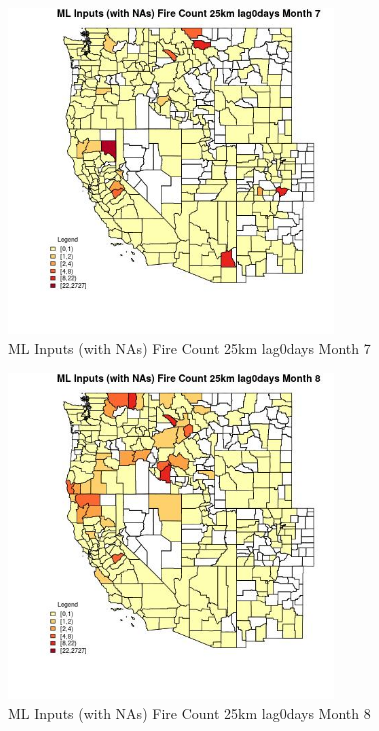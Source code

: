\begin{figure} 
\centering  
\includegraphics[width=0.77\textwidth]{Code_Outputs/Report_ML_input_PM25_Step4_part_f_de_duplicated_aves_prioritize_24hr_obswNAs_CountyFire_Count_25km_lag0daysmedianMonth7.jpg} 
\caption{\label{fig:Report_ML_input_PM25_Step4_part_f_de_duplicated_aves_prioritize_24hr_obswNAsCountyFire_Count_25km_lag0daysmedianMonth7}ML Inputs (with NAs) Fire Count 25km lag0days Month 7} 
\end{figure} 
 

\begin{figure} 
\centering  
\includegraphics[width=0.77\textwidth]{Code_Outputs/Report_ML_input_PM25_Step4_part_f_de_duplicated_aves_prioritize_24hr_obswNAs_CountyFire_Count_25km_lag0daysmedianMonth8.jpg} 
\caption{\label{fig:Report_ML_input_PM25_Step4_part_f_de_duplicated_aves_prioritize_24hr_obswNAsCountyFire_Count_25km_lag0daysmedianMonth8}ML Inputs (with NAs) Fire Count 25km lag0days Month 8} 
\end{figure} 
 

